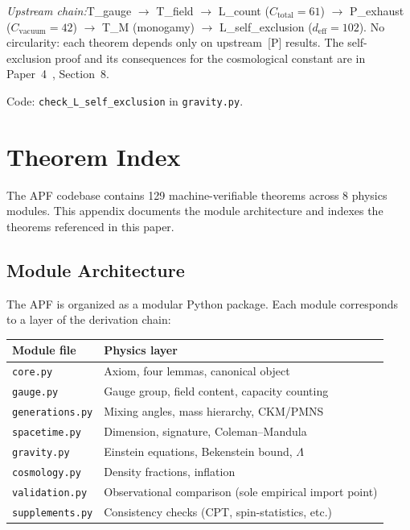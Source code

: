 \documentclass[11pt]{article}
\newcommand{\Ctot}{C_{\mathrm{total}}}
\newcommand{\deff}{d_{\mathrm{eff}}}
\begin{document}
\textit{Upstream chain:}\quad T\_gauge $\to$ T\_field $\to$ L\_count ($\Ctot = 61$) $\to$ P\_exhaust ($C_{\mathrm{vacuum}} = 42$) $\to$ T\_M (monogamy) $\to$ L\_self\_exclusion ($\deff = 102$).  No circularity: each theorem depends only on upstream~[P] results.  The self-exclusion proof and its consequences for the cosmological constant are in Paper~4~\cite{P4}, Section~8.

Code: \texttt{check\_L\_self\_exclusion} in \texttt{gravity.py}.


\section{Theorem Index}

The APF codebase contains 129 machine-verifiable theorems across 8 physics modules.  This appendix documents the module architecture and indexes the theorems referenced in this paper.

\subsection*{Module Architecture}

The APF is organized as a modular Python package.  Each module corresponds to a layer of the derivation chain:

\smallskip
\begin{center}
\small
\begin{tabular}{ll}
\toprule
\textbf{Module file} & \textbf{Physics layer} \\
\midrule
\texttt{core.py}         & Axiom, four lemmas, canonical object \\
\texttt{gauge.py}        & Gauge group, field content, capacity counting \\
\texttt{generations.py}  & Mixing angles, mass hierarchy, CKM/PMNS \\
\texttt{spacetime.py}    & Dimension, signature, Coleman--Mandula \\
\texttt{gravity.py}      & Einstein equations, Bekenstein bound, $\Lambda$ \\
\texttt{cosmology.py}    & Density fractions, inflation \\
\texttt{validation.py}   & Observational comparison (sole empirical import point) \\
\texttt{supplements.py}  & Consistency checks (CPT, spin-statistics, etc.) \\
\bottomrule
\end{tabular}
\end{center}
\smallskip
\end{document}
